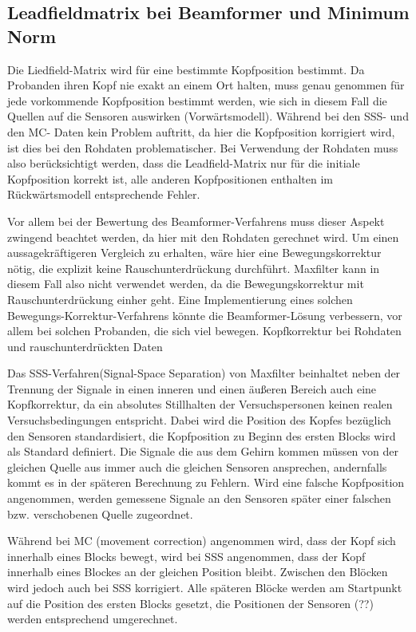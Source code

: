 \documentclass[doc,a4paper,12pt]{apa6}
\begin{document}
\subsection{Leadfieldmatrix bei Beamformer und Minimum Norm}

Die Liedfield-Matrix wird für eine bestimmte Kopfposition bestimmt. Da Probanden ihren Kopf nie exakt an einem Ort halten, muss genau genommen für jede vorkommende Kopfposition bestimmt werden, wie sich in diesem Fall die Quellen auf die Sensoren auswirken (Vorwärtsmodell). Während bei den SSS- und den MC- Daten kein Problem auftritt, da hier die Kopfposition korrigiert wird, ist dies bei den Rohdaten problematischer. Bei Verwendung der Rohdaten muss also berücksichtigt werden, dass die Leadfield-Matrix nur für die initiale Kopfposition korrekt ist, alle anderen Kopfpositionen enthalten im Rückwärtsmodell entsprechende Fehler.

Vor allem bei der Bewertung des Beamformer-Verfahrens muss dieser Aspekt zwingend beachtet werden, da hier mit den Rohdaten gerechnet wird. Um einen aussagekräftigeren Vergleich zu erhalten, wäre hier eine Bewegungskorrektur nötig, die explizit keine Rauschunterdrückung durchführt. Maxfilter kann in diesem Fall also nicht verwendet werden, da die Bewegungskorrektur mit Rauschunterdrückung einher geht. Eine Implementierung eines solchen Bewegungs-Korrektur-Verfahrens könnte die Beamformer-Lösung verbessern, vor allem bei solchen Probanden, die sich viel bewegen.
Kopfkorrektur bei Rohdaten und rauschunterdrückten Daten

Das SSS-Verfahren(Signal-Space Separation) von Maxfilter beinhaltet neben der Trennung der Signale in einen inneren und einen äußeren Bereich auch eine Kopfkorrektur, da ein absolutes Stillhalten der Versuchspersonen keinen realen Versuchsbedingungen entspricht. Dabei wird die Position des Kopfes bezüglich den Sensoren standardisiert, die Kopfposition zu Beginn des ersten Blocks wird als Standard definiert. Die Signale die aus dem Gehirn kommen müssen von der gleichen Quelle aus immer auch die gleichen Sensoren ansprechen, andernfalls kommt es in der späteren Berechnung zu Fehlern. Wird eine falsche Kopfposition angenommen, werden gemessene Signale an den Sensoren später einer falschen bzw. verschobenen Quelle zugeordnet.

Während bei MC (movement correction) angenommen wird, dass der Kopf sich innerhalb eines Blocks bewegt, wird bei SSS angenommen, dass der Kopf innerhalb eines Blockes an der gleichen Position bleibt. Zwischen den Blöcken wird jedoch auch bei SSS korrigiert. Alle späteren Blöcke werden am Startpunkt auf die Position des ersten Blocks gesetzt, die Positionen der Sensoren (??) werden entsprechend umgerechnet.
\end{document}
